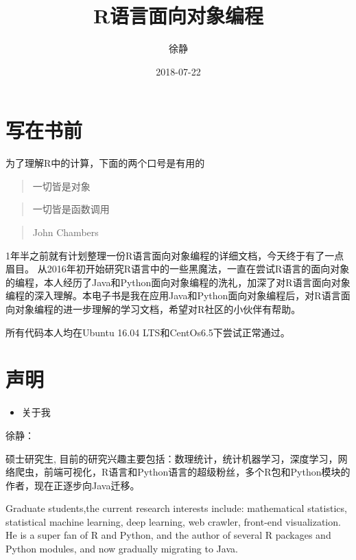 \documentclass[]{book}
\title{R语言面向对象编程}
\author{徐静}
\date{2018-07-22}
\providecommand{\tightlist}{%
  \setlength{\itemsep}{0pt}\setlength{\parskip}{0pt}}
\begin{document}
\maketitle

{
\setcounter{tocdepth}{1}
\tableofcontents
}
\chapter*{写在书前}

为了理解R中的计算，下面的两个口号是有用的

\begin{quote}
一切皆是对象
\end{quote}

\begin{quote}
一切皆是函数调用
\end{quote}

\begin{quote}
John Chambers
\end{quote}

1年半之前就有计划整理一份R语言面向对象编程的详细文档，今天终于有了一点眉目。
从2016年初开始研究R语言中的一些黑魔法，一直在尝试R语言的面向对象的编程，本人经历了Java和Python面向对象编程的洗礼，加深了对R语言面向对象编程的深入理解。本电子书是我在应用Java和Python面向对象编程后，对R语言面向对象编程的进一步理解的学习文档，希望对R社区的小伙伴有帮助。

所有代码本人均在Ubuntu 16.04 LTS和CentOs6.5下尝试正常通过。

\chapter*{声明}

\begin{itemize}
\tightlist
\item
  关于我
\end{itemize}

徐静：

硕士研究生,
目前的研究兴趣主要包括：数理统计，统计机器学习，深度学习，网络爬虫，前端可视化，R语言和Python语言的超级粉丝，多个R包和Python模块的作者，现在正逐步向Java迁移。

Graduate students,the current research interests include: mathematical
statistics, statistical machine learning, deep learning, web crawler,
front-end visualization. He is a super fan of R and Python, and the
author of several R packages and Python modules, and now gradually
migrating to Java.
\end{document}
